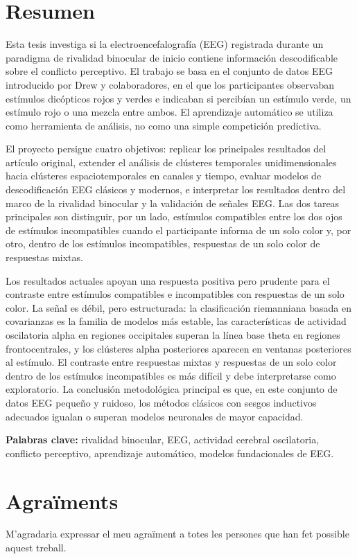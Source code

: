 \documentclass[11pt,a4paper,chapterprefix=false,parskip=false]{scrreprt}
\begin{document}
\chapter*{Resumen}
Esta tesis investiga si la electroencefalografía (EEG) registrada durante un paradigma de rivalidad binocular de inicio contiene información descodificable sobre el conflicto perceptivo. El trabajo se basa en el conjunto de datos EEG introducido por Drew y colaboradores, en el que los participantes observaban estímulos dicópticos rojos y verdes e indicaban si percibían un estímulo verde, un estímulo rojo o una mezcla entre ambos. El aprendizaje automático se utiliza como herramienta de análisis, no como una simple competición predictiva.

El proyecto persigue cuatro objetivos: replicar los principales resultados del artículo original, extender el análisis de clústeres temporales unidimensionales hacia clústeres espaciotemporales en canales y tiempo, evaluar modelos de descodificación EEG clásicos y modernos, e interpretar los resultados dentro del marco de la rivalidad binocular y la validación de señales EEG. Las dos tareas principales son distinguir, por un lado, estímulos compatibles entre los dos ojos de estímulos incompatibles cuando el participante informa de un solo color y, por otro, dentro de los estímulos incompatibles, respuestas de un solo color de respuestas mixtas.

Los resultados actuales apoyan una respuesta positiva pero prudente para el contraste entre estímulos compatibles e incompatibles con respuestas de un solo color. La señal es débil, pero estructurada: la clasificación riemanniana basada en covarianzas es la familia de modelos más estable, las características de actividad oscilatoria alpha en regiones occipitales superan la línea base theta en regiones frontocentrales, y los clústeres alpha posteriores aparecen en ventanas posteriores al estímulo. El contraste entre respuestas mixtas y respuestas de un solo color dentro de los estímulos incompatibles es más difícil y debe interpretarse como exploratorio. La conclusión metodológica principal es que, en este conjunto de datos EEG pequeño y ruidoso, los métodos clásicos con sesgos inductivos adecuados igualan o superan modelos neuronales de mayor capacidad.

\textbf{Palabras clave:} rivalidad binocular, EEG, actividad cerebral oscilatoria, conflicto perceptivo, aprendizaje automático, modelos fundacionales de EEG.

\chapter*{Agraïments}
M'agradaria expressar el meu agraïment a totes les persones que han fet possible aquest treball.
\end{document}
